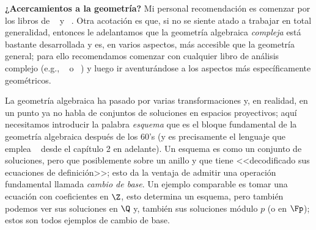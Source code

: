 \documentclass[11pt, reqno]{amsart}
\begin{document}
\textbf{¿Acercamientos a la geometría?}
Mi personal recomendación es comenzar por los libros de \citeauthor{smith:AG}~\cite{smith:AG} y \citeauthor{kempf:varieties}~\cite{kempf:varieties}.
Otra acotación es que, si no se siente atado a trabajar en total generalidad, entonces le adelantamos que la geometría algebraica \textit{compleja} está bastante
desarrollada y es, en varios aspectos, más accesible que la geometría general; para ello recomendamos comenzar con cualquier libro de análisis complejo
(e.g., \citeauthor{lang:complex}~\cite{lang:complex} o \citeauthor{kodaira:complex}~\cite{kodaira:complex}) y luego ir aventurándose a los aspectos más
específicamente geométricos.

La geometría algebraica ha pasado por varias transformaciones y, en realidad, en un punto ya no habla de conjuntos de soluciones en espacios proyectivos;
aquí necesitamos introducir la palabra \textit{esquema} que es el bloque fundamental de la geometría algebraica después de los 60's (y es precisamente
el lenguaje que emplea \citeauthor{hartshorne:algebraic}~\cite{hartshorne:algebraic} desde el capítulo 2 en adelante).
Un esquema es como un conjunto de soluciones, pero que posiblemente sobre un anillo y que tiene <<decodificado sus ecuaciones de definición>>;
esto da la ventaja de admitir una operación fundamental llamada \textit{cambio de base}.
Un ejemplo comparable es tomar una ecuación con coeficientes en $\Z$, esto determina un esquema, pero también podemos ver sus soluciones en $\Q$ y,
también sus soluciones módulo $p$ (o en $\Fp$); estos son todos ejemplos de cambio de base.

\printbibliography[title={Referencias y lecturas adicionales}]
\end{document}
